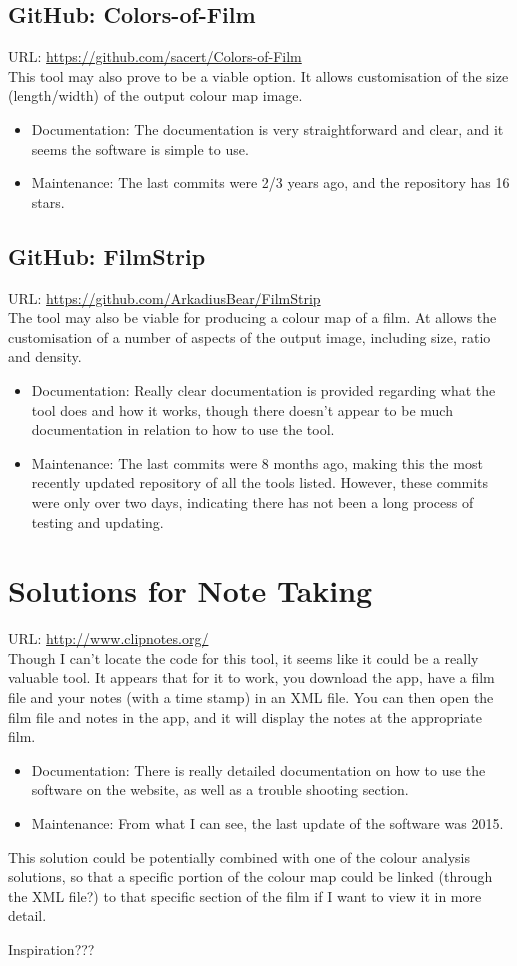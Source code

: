 \documentclass{article}
\begin{document}
\subsection{GitHub: Colors-of-Film}
URL: \url{https://github.com/sacert/Colors-of-Film}\\
This tool may also prove to be a viable option. It allows customisation of the size (length/width) of the output colour map image.
\begin{itemize}
    \item Documentation: The documentation is very straightforward and clear, and it seems the software is simple to use.
    \item Maintenance: The last commits were 2/3 years ago, and the repository has 16 stars.
\end{itemize}

\subsection{GitHub: FilmStrip}
URL: \url{https://github.com/ArkadiusBear/FilmStrip}\\
The tool may also be viable for producing a colour map of a film. At allows the customisation of a number of aspects of the output image, including size, ratio and density.

\begin{itemize}
    \item Documentation: Really clear documentation is provided regarding what the tool does and how it works, though there doesn't appear to be much documentation in relation to how to use the tool.
    \item Maintenance: The last commits were 8 months ago, making this the most recently updated repository of all the tools listed. However, these commits were only over two days, indicating there has not been a long process of testing and updating.
\end{itemize}
 
\section*{Solutions for Note Taking}
URL: \url{http://www.clipnotes.org/}\\
Though I can't locate the code for this tool, it seems like it could be a really valuable tool. It appears that for it to work, you download the app, have a film file and your notes (with a time stamp) in an XML file. You can then open the film file and notes in the app, and it will display the notes at the appropriate film.
\begin{itemize}
    \item Documentation: There is really detailed documentation on how to use the software on the website, as well as a trouble shooting section.
    \item Maintenance: From what I can see, the last update of the software was 2015.
\end{itemize}

This solution could be potentially combined with one of the colour analysis solutions, so that a specific portion of the colour map could be linked (through the XML file?) to that specific section of the film if I want to view it in more detail.

Inspiration???
\end{document}
